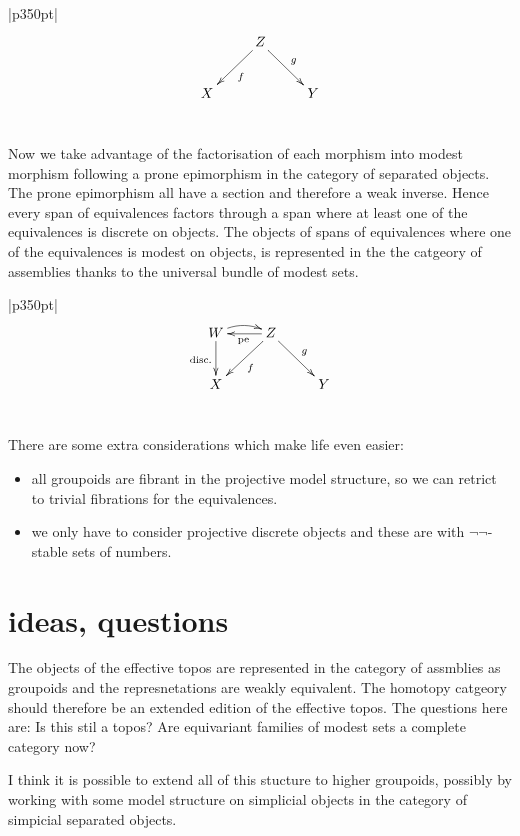\documentclass[12pt,a4paper]{article}
\theoremstyle{definition}
\newenvironment{blackboard}{\begin{tabular}{|p{350pt}|}\hline} {\\ \hline \end{tabular} }
\begin{document}
\begin{blackboard}
\[\xymatrix{ & Z\ar[dl]^f\ar[dr]^g \\ X&& Y }\] 
\end{blackboard}

Now we take advantage of the factorisation of each morphism into modest morphism following a prone epimorphism in the category of separated objects. The prone epimorphism all have a section and therefore a weak inverse. Hence every span of equivalences factors through a span where at least one of the equivalences is discrete on objects. The objects of spans of equivalences where one of the equivalences is modest on objects, is represented in the the catgeory of assemblies thanks to the universal bundle of modest sets.

\begin{blackboard}
\[\xymatrix{ W\ar[d]_{\textrm{disc.}}\ar@/^/[r] & Z\ar[l]^{\textrm{pe}}\ar[dl]^f\ar[dr]^g \\ X&& Y }\] 
\end{blackboard}

There are some extra considerations which make life even easier:
\begin{itemize}
\item all groupoids are fibrant in the projective model structure, so we can retrict to trivial fibrations for the equivalences.
\item we only have to consider projective discrete objects and these are with $\neg\neg$-stable sets of numbers.
\end{itemize}


\section{ideas, questions}
The objects of the effective topos are represented in the category of assmblies as groupoids and the represnetations are weakly equivalent. The homotopy catgeory should therefore be an extended edition of the effective topos. The questions here are: Is this stil a topos? Are equivariant families of modest sets a complete category now?

I think it is possible to extend all of this stucture to higher groupoids, possibly by working with some model structure on simplicial objects in the category of simpicial separated objects.
\end{document}
